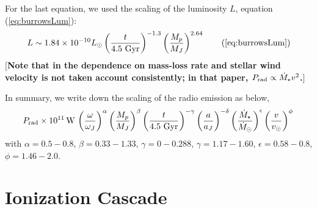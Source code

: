 \documentclass[iop,numberedappendix,apj]{emulateapj}
\def\memoYF#1{\color{red}$[${\bf #1}$]$ \color{black}}
\begin{document}
For the last equation, we used the scaling of the luminosity $L$, equation (\ref{eq:burrowsLum}):
\begin{equation}
L \sim 1.84\times10^{-10} L_\odot \left( \frac{t}{4.5 \rm~Gyr} \right)^{-1.3} \left( \frac{M_p}{M_J} \right)^{2.64} \tag{\ref{eq:burrowsLum}}
\end{equation} 
\memoYF{Note that in \citet{ignace2010} the dependence on mass-loss rate and stellar wind velocity is not taken account consistently; in that paper, $P_{\rm rad} \propto \dot M_{\star } v^2$.}

In summary, we write down the scaling of the radio emission as below, 
\begin{equation}
P_{\rm rad} \times 10^{11} \,{\rm W}\, \left( \frac{\omega}{\omega _J} \right)^{\alpha } \left( \frac{M_p}{M_J} \right)^{\beta }  \left( \frac{t}{4.5 \rm~Gyr} \right)^{-\gamma }  \left( \frac{a}{a_J} \right)^{-\delta }  \left( \frac{\dot M_\star}{\dot M_{\odot}} \right)^{\epsilon } \left( \frac{v}{v_{\odot}} \right)^{\phi } \, \\
\end{equation} 
with $\alpha = 0.5-0.8$, $\beta = 0.33-1.33$, $\gamma = 0-0.288$, $\gamma = 1.17-1.60$, $\epsilon = 0.58-0.8$, $\phi = 1.46-2.0$. 


\section{Ionization Cascade}
\label{sec:AppendixB}
\end{document}
